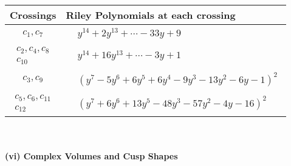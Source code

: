 \documentclass[1p]{elsarticle_modified}
\theoremstyle{definition}
\begin{document}
\begin{tabular}{m{50pt}|m{274pt}}
Crossings & \hspace{64pt}Riley Polynomials at each crossing \\
\hline $$\begin{aligned}c_{1},c_{7}\end{aligned}$$&$\begin{aligned}
&y^{14}+2 y^{13}+\cdots-33 y+9
\end{aligned}$\\
\hline $$\begin{aligned}c_{2},c_{4},c_{8}\\c_{10}\end{aligned}$$&$\begin{aligned}
&y^{14}+16 y^{13}+\cdots-3 y+1
\end{aligned}$\\
\hline $$\begin{aligned}c_{3},c_{9}\end{aligned}$$&$\begin{aligned}
&(y^7-5 y^6+6 y^5+6 y^4-9 y^3-13 y^2-6 y-1)^2
\end{aligned}$\\
\hline $$\begin{aligned}c_{5},c_{6},c_{11}\\c_{12}\end{aligned}$$&$\begin{aligned}
&(y^7+6 y^6+13 y^5-48 y^3-57 y^2-4 y-16)^2
\end{aligned}$\\
\hline
\end{tabular}\\~\\
\newpage\flushleft \textbf{(vi) Complex Volumes and Cusp Shapes}
\end{document}

